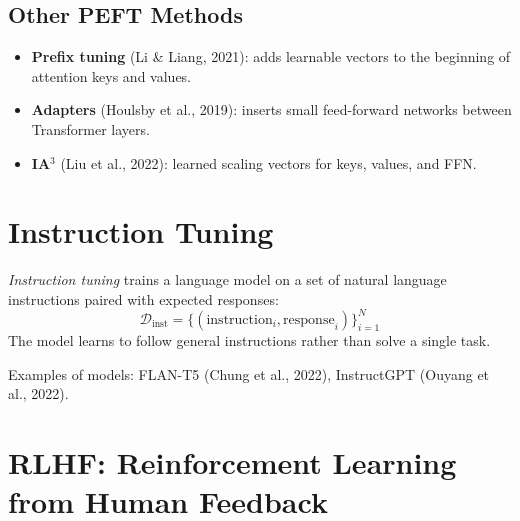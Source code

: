 \subsection{Other PEFT Methods}

\begin{itemize}
    \item \textbf{Prefix tuning} (Li \& Liang, 2021): adds learnable vectors
          to the beginning of attention keys and values.
    \item \textbf{Adapters} (Houlsby et al., 2019): inserts small feed-forward
          networks between Transformer layers.
    \item \textbf{IA$^3$} (Liu et al., 2022): learned scaling vectors for keys,
          values, and FFN.
\end{itemize}

\section{Instruction Tuning}
\label{sec:ft:instruction}

\begin{definition}
\emph{Instruction tuning} trains a language model on a set of natural language
instructions paired with expected responses:
\[
\mathcal{D}_{\text{inst}} = \{(\text{instruction}_i, \text{response}_i)\}_{i=1}^{N}
\]
The model learns to follow general instructions rather than solve a single task.
\end{definition}

Examples of models: FLAN-T5 (Chung et al., 2022), InstructGPT (Ouyang et al.,
2022).

\section{RLHF: Reinforcement Learning from Human Feedback}
\label{sec:ft:rlhf}

